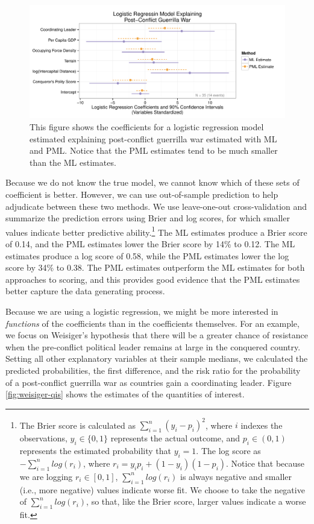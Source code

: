 \documentclass[12pt]{article}
\begin{document}
\begin{figure}[h]
\begin{center}
\includegraphics[width = \textwidth]{figs/weisiger-coefs.pdf}
\caption{This figure shows the coefficients for a logistic regression model estimated explaining post-conflict guerrilla war estimated with ML and PML. 
Notice that the PML estimates tend to be much smaller than the ML estimates.}\label{fig:weisiger-coefs}
\end{center}
\end{figure}

Because we do not know the true model, we cannot know which of these sets of coefficient is better. 
However, we can use out-of-sample prediction to help adjudicate between these two methods. 
We use leave-one-out cross-validation and summarize the prediction errors using Brier and log scores, for which smaller values indicate better predictive ability.\footnote{The Brier score is calculated as $\sum_{i = 1}^n (y_i - p_i)^2$, where $i$ indexes the observations, $y_i \in \{0, 1\}$ represents the actual outcome, and $p_i \in (0, 1)$ represents the estimated probability that $y_i = 1$. 
The log score as $-\sum_{i = 1}^n log(r_i)$, where $r_i = y_i p_i + (1 - y_i)(1 - p_i)$. 
Notice that because we are logging $r_i \in [0, 1]$, $\sum_{i = 1}^n log(r_i)$ is always negative and smaller (i.e., more negative) values indicate worse fit. 
We choose to take the negative of $\sum_{i = 1}^n log(r_i)$, so that, like the Brier score, larger values indicate a worse fit.} 
The ML estimates produce a Brier score of 0.14, and the PML estimates lower the Brier score by 14\% to 0.12. 
The ML estimates produce a log score of 0.58, while the PML estimates lower the log score by 34\% to 0.38. 
The PML estimates outperform the ML estimates for both approaches to scoring, and
this provides good evidence that the PML estimates better capture the data generating process.

Because we are using a logistic regression, we might be more interested in \textit{functions} of the coefficients than in the coefficients themselves. 
For an example, we focus on Weisiger's hypothesis that there will be a greater chance of resistance when the pre-conflict political leader remains at large in the conquered country.
Setting all other explanatory variables at their sample medians, we calculated the predicted probabilities, the first difference, and the risk ratio for the probability of a post-conflict guerrilla war as countries gain a coordinating leader. 
Figure \ref{fig:weisiger-qis} shows the estimates of the quantities of interest.
\end{document}
